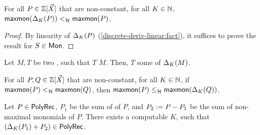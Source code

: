 \begin{lemma}
    \label{derivation-simplifies:lemma}
    For all $P \in \mathbb{Z}[\vec{X}]$ that are non-constant,
    for all $K \in \mathbb{N}$,
    $\mathop{\mathsf{maxmon}}(\Delta_{K}(P)) <_{\mathcal{H}}
    \mathop{\mathsf{maxmon}}(P)$.
\end{lemma}
\begin{proof}
    By linearity of $\Delta_{K}(P)$ (\cref{discrete-deriv-linear:fact}), 
    it suffices to prove the result
    for  $S \in \Monomials$.
\end{proof}

\begin{fact}
    Let $M,T$ be two , such that
    $T$  $M$.
    Then,
    $T$  some 
    of $\Delta_{K}(M)$.
\end{fact}

\begin{lemma}
    \label{derivation-covers:lemma}
    For all $P,Q \in \mathbb{Z}[\vec{X}]$ that are non-constant,
    for all $K \in \mathbb{N}$,
    if $\mathop{\mathsf{maxmon}}(P) <_{\mathcal{H}} \mathop{\mathsf{maxmon}}(Q)$,
    then
    $\mathop{\mathsf{maxmon}}(P) \leq_{\mathcal{H}} \mathop{\mathsf{maxmon}}(\Delta_{K}(Q))$.
\end{lemma}


\begin{lemma}
    \label{derivation-stabilises-correct:lem}
    Let $P \in \mathsf{PolyRec}$,
    $P_1$ be the sum of  of $P$,
    and $P_2 \mathrel{:=} P - P_1$ be the sum of
    non-maximal monomials of $P$.
    There exists a computable $K$,
    such that
    $(\Delta_{K}(P_1) + P_2) \in \mathsf{PolyRec}$.
\end{lemma}

